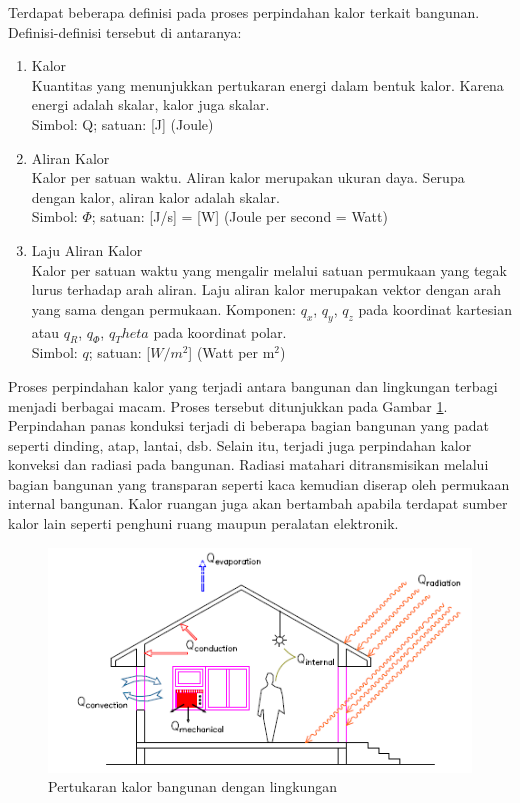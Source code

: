 Terdapat beberapa definisi pada proses perpindahan kalor terkait bangunan. Definisi-definisi tersebut di antaranya:\cite{BuildingPhysics}

\begin{enumerate}
	\item Kalor \\
	Kuantitas yang menunjukkan pertukaran energi dalam bentuk kalor. Karena energi adalah skalar, kalor juga skalar.\\
	Simbol: Q; satuan: [J] (Joule)
	\item Aliran Kalor \\
	Kalor per satuan waktu. Aliran kalor merupakan ukuran daya. Serupa dengan kalor, aliran kalor adalah skalar.\\
	Simbol: $\Phi$; satuan: [J/s] = [W] (Joule per second = Watt)
	\item Laju Aliran Kalor \\
	Kalor per satuan waktu yang mengalir melalui satuan permukaan yang tegak lurus terhadap arah aliran. Laju aliran kalor merupakan vektor dengan arah yang sama dengan permukaan. Komponen: $q_x$, $q_y$, $q_z$ pada koordinat kartesian atau $q_R$, $q_\Phi$, $q_Theta$ pada koordinat polar.\\
	Simbol: $q$; satuan: [$W/m^2$] (Watt per m$^2$)
\end{enumerate}

Proses perpindahan kalor yang terjadi antara bangunan dan lingkungan terbagi menjadi berbagai macam. Proses tersebut ditunjukkan pada Gambar \ref{fig:3:HeatTransferProcess}. Perpindahan panas konduksi terjadi di beberapa bagian bangunan yang padat seperti dinding, atap, lantai, dsb. Selain itu, terjadi juga perpindahan kalor konveksi dan radiasi pada bangunan. Radiasi matahari ditransmisikan melalui bagian bangunan yang transparan seperti kaca kemudian diserap oleh permukaan internal bangunan. Kalor ruangan juga akan bertambah apabila terdapat sumber kalor lain seperti penghuni ruang maupun peralatan elektronik.\cite{skripsiIchfan}

\begin{figure}[!h]
	\centering
	\includegraphics[width=1\textwidth]{figures/HeatTransferProcess}
	\caption{Pertukaran kalor bangunan dengan lingkungan\cite{skripsiIchfan}}
	\label{fig:3:HeatTransferProcess}
\end{figure}

